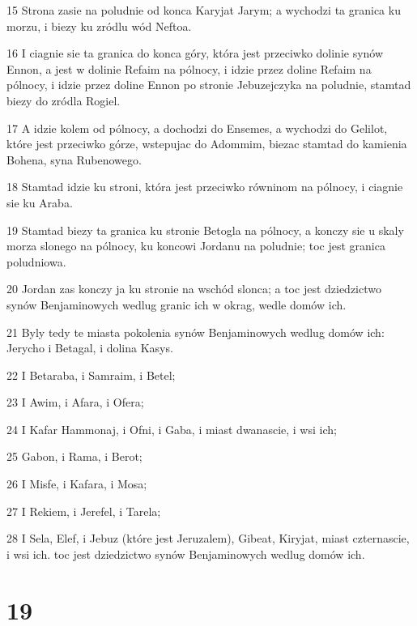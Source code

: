 \par 15 Strona zasie na poludnie od konca Karyjat Jarym; a wychodzi ta granica ku morzu, i biezy ku zródlu wód Neftoa.
\par 16 I ciagnie sie ta granica do konca góry, która jest przeciwko dolinie synów Ennon, a jest w dolinie Refaim na pólnocy, i idzie przez doline Refaim na pólnocy, i idzie przez doline Ennon po stronie Jebuzejczyka na poludnie, stamtad biezy do zródla Rogiel.
\par 17 A idzie kolem od pólnocy, a dochodzi do Ensemes, a wychodzi do Gelilot, które jest przeciwko górze, wstepujac do Adommim, biezac stamtad do kamienia Bohena, syna Rubenowego.
\par 18 Stamtad idzie ku stroni, która jest przeciwko równinom na pólnocy, i ciagnie sie ku Araba.
\par 19 Stamtad biezy ta granica ku stronie Betogla na pólnocy, a konczy sie u skaly morza slonego na pólnocy, ku koncowi Jordanu na poludnie; toc jest granica poludniowa.
\par 20 Jordan zas konczy ja ku stronie na wschód slonca; a toc jest dziedzictwo synów Benjaminowych wedlug granic ich w okrag, wedle domów ich.
\par 21 Byly tedy te miasta pokolenia synów Benjaminowych wedlug domów ich: Jerycho i Betagal, i dolina Kasys.
\par 22 I Betaraba, i Samraim, i Betel;
\par 23 I Awim, i Afara, i Ofera;
\par 24 I Kafar Hammonaj, i Ofni, i Gaba, i miast dwanascie, i wsi ich;
\par 25 Gabon, i Rama, i Berot;
\par 26 I Misfe, i Kafara, i Mosa;
\par 27 I Rekiem, i Jerefel, i Tarela;
\par 28 I Sela, Elef, i Jebuz (które jest Jeruzalem), Gibeat, Kiryjat, miast czternascie, i wsi ich. toc jest dziedzictwo synów Benjaminowych wedlug domów ich.

\chapter{19}

